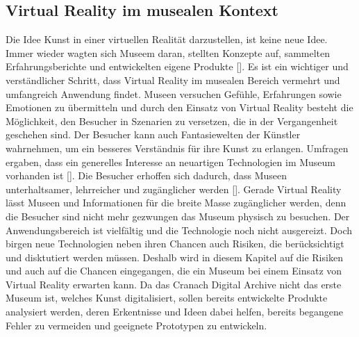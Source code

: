 \documentclass[a4paper,12pt,oneside]{article}
\begin{document}
    \subsection{Virtual Reality im musealen Kontext}
      Die Idee Kunst in einer virtuellen Realität darzustellen, ist keine neue Idee.
      Immer wieder wagten sich Museem daran, stellten Konzepte auf, sammelten
      Erfahrungsberichte und entwickelten eigene Produkte [\cite{Heidsiek2019}]. Es ist
      ein wichtiger und verständlicher Schritt, dass Virtual Reality
      im musealen Bereich vermehrt und umfangreich Anwendung findet. Museen versuchen Gefühle,
      Erfahrungen sowie Emotionen zu übermitteln und durch den Einsatz von Virtual Reality
      besteht die Möglichkeit, den Besucher in Szenarien zu versetzen, die in der
      Vergangenheit geschehen sind. Der Besucher kann auch Fantasiewelten der Künstler
      wahrnehmen, um ein besseres Verständnis für ihre Kunst zu erlangen. Umfragen ergaben, 
      dass ein generelles Interesse an neuartigen Technologien im Museum vorhanden ist [\cite[34]{Heidsiek2019}].
      Die Besucher erhoffen sich dadurch, dass Museen unterhaltsamer, lehrreicher und
      zugänglicher werden [\cite[34]{Heidsiek2019}]. Gerade Virtual Reality lässt Museen
      und Informationen für die breite Masse zugänglicher werden, denn die Besucher 
      sind nicht mehr gezwungen 
      das Museum physisch zu besuchen. Der Anwendungsbereich ist vielfältig und die 
      Technologie noch nicht ausgereizt.
      Doch birgen neue Technologien neben ihren Chancen auch Risiken, die berücksichtigt
      und disktutiert werden müssen. Deshalb wird in diesem Kapitel auf die
      Risiken und auch auf die Chancen eingegangen, die ein Museum bei einem Einsatz von
      Virtual Reality erwarten kann. Da das Cranach Digital Archive nicht das erste Museum ist, 
      welches Kunst digitalisiert, sollen bereits entwickelte Produkte analysiert
      werden, deren Erkentnisse und Ideen dabei helfen, bereits begangene Fehler zu 
      vermeiden und geeignete Prototypen zu entwickeln.
\end{document}
